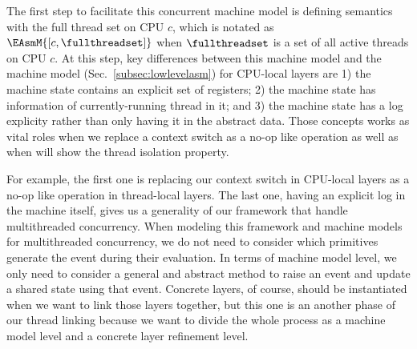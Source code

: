 The first step to facilitate this concurrent machine model is defining semantics with the full thread set on CPU $c$,
which is notated as $\EAsmM{[c, \fullthreadset]}$ when $\fullthreadset$ is a set of all active threads on CPU $c$.
At this step, key differences between this machine model and the machine model 
(Sec.~\ref{subsec:lowlevelasm}) for CPU-local layers are
1) the machine state contains an explicit set of registers;
2) the machine state has  information of currently-running thread in it; and 
3) the machine state has a log explicity rather than only having it in the abstract data. 
Those concepts works as vital roles when we replace a context switch as a no-op like operation as well as
when will show the thread isolation property.

For example, the first one is replacing our context switch 
in CPU-local layers as a no-op like operation in thread-local layers.
The last one, having an explicit log in the machine itself, gives us 
a generality of our framework that handle multithreaded concurrency. 
When modeling this framework and machine models for multithreaded concurrency, 
we do not need to consider which primitives 
generate the event during their evaluation.
In terms of machine model level, 
we only need to consider a general and abstract method to raise an event and update 
a shared state using that event.
Concrete layers, of course, should be instantiated when we want to link those layers together, but 
this one is an another phase of our thread linking because we want to divide the whole process as 
a machine model level and a concrete layer refinement level. 

